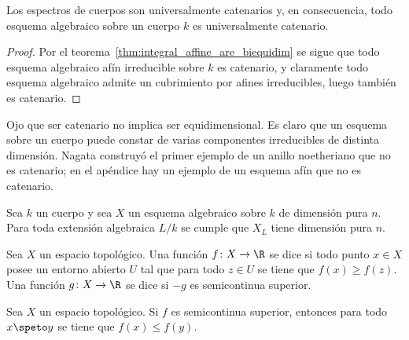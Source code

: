 \begin{cor}
	Los espectros de cuerpos son universalmente catenarios y, en consecuencia, todo esquema algebraico sobre un cuerpo $k$ es universalmente catenario.
\end{cor}
\begin{proof}
	Por el teorema~\ref{thm:integral_affine_are_biequidim} se sigue que todo esquema algebraico afín irreducible sobre $k$ es catenario, y claramente
	todo esquema algebraico admite un cubrimiento por afines irreducibles, luego también es catenario.
\end{proof}
\warn
Ojo que ser catenario no implica ser equidimensional.
Es claro que un esquema sobre un cuerpo puede constar de varias componentes irreducibles de distinta dimensión.
Nagata construyó el primer ejemplo de un anillo noetheriano que no es catenario; en el apéndice hay un ejemplo de un esquema afín que no es catenario.

\begin{prop}\label{thm:dimension_on_alg_base_change}
	Sea $k$ un cuerpo y sea $X$ un esquema algebraico sobre $k$ de dimensión pura $n$.
	Para toda extensión algebraica $L/k$ se cumple que $X_L$ tiene dimensión pura $n$.
\end{prop}

\begin{mydef}
	Sea $X$ un espacio topológico.
	Una función $f \colon X \to \R$ se dice  si todo punto $x \in X$
	posee un entorno abierto $U$ tal que para todo $z \in U$ se tiene que $f(x) \ge f(z)$.
	Una función $g \colon X \to \R$ se dice  si $-g$ es semicontinua superior.
\end{mydef}
\begin{prop}
	Sea $X$ un espacio topológico.
	Si $f$ es semicontinua superior, entonces para todo $x \speto y$ se tiene que $f(x) \le f(y)$.
\end{prop}

